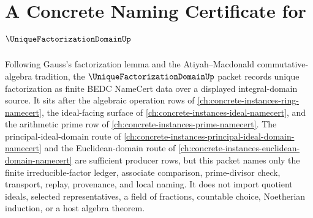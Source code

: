\chapter{A Concrete Naming Certificate for $\UniqueFactorizationDomainUp$}
\label{ch:concrete-instances-unique-factorization-domain-namecert}

Following Gauss's factorization lemma and the Atiyah--Macdonald commutative-algebra tradition, the $\UniqueFactorizationDomainUp$ packet records unique factorization as finite BEDC NameCert data over a displayed integral-domain source. It sits after the algebraic operation rows of \autoref{ch:concrete-instances-ring-namecert}, the ideal-facing surface of \autoref{ch:concrete-instances-ideal-namecert}, and the arithmetic prime row of \autoref{ch:concrete-instances-prime-namecert}. The principal-ideal-domain route of \autoref{ch:concrete-instances-principal-ideal-domain-namecert} and the Euclidean-domain route of \autoref{ch:concrete-instances-euclidean-domain-namecert} are sufficient producer rows, but this packet names only the finite irreducible-factor ledger, associate comparison, prime-divisor check, transport, replay, provenance, and local naming. It does not import quotient ideals, selected representatives, a field of fractions, countable choice, Noetherian induction, or a host algebra theorem.

